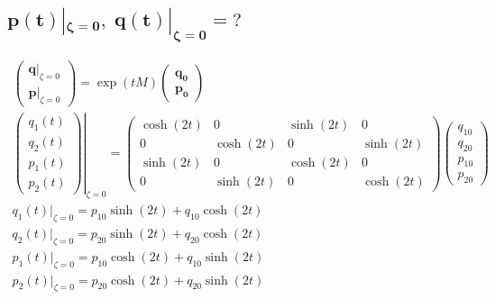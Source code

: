 \documentclass[10pt,a4paper]{article}
\newcommand{\mat}[1]{
    \begin{pmatrix}
        #1
    \end{pmatrix}
}
\begin{document}
\subsection{
    \texorpdfstring{
        $\pmb{ p(t)|_{\zeta=0}, \; q(t)|_{\zeta=0} = \mathit{?} }$
    }{
        p(t)|\{z=0\}, q(t)|\{z=0\} = ?
    }
}
\begin{gather*}
    \mat{
        \bm{q}|_{\zeta=0} \\ \bm{p}|_{\zeta=0}
    }
    =
    \exp(tM)
    \mat{
        \bm{q_0} \\ \bm{p_0}
    }
    \\[15pt]
    \left.
    \mat{
        q_1(t) \\ q_2(t) \\ p_1(t) \\ p_2(t)
    }
    \right|_{\zeta=0}
    =
    \mat{\cosh{\left(2 t \right)} & 0 & \sinh{\left(2 t \right)} & 0\\0 & \cosh{\left(2 t \right)} & 0 & \sinh{\left(2 t \right)}\\\sinh{\left(2 t \right)} & 0 & \cosh{\left(2 t \right)} & 0\\0 & \sinh{\left(2 t \right)} & 0 & \cosh{\left(2 t \right)}}
    \mat{
        q_{10} \\ q_{20} \\ p_{10} \\ p_{20}
    }
    \\[20pt]
    q_1(t)|_{\zeta=0} = p_{10} \sinh{\left(2 t \right)} + q_{10} \cosh{\left(2 t \right)}
    \\[5pt]
    q_2(t)|_{\zeta=0} = p_{20} \sinh{\left(2 t \right)} + q_{20} \cosh{\left(2 t \right)}
    \\[5pt]
    p_1(t)|_{\zeta=0} = p_{10} \cosh{\left(2 t \right)} + q_{10} \sinh{\left(2 t \right)}
    \\[5pt]
    p_2(t)|_{\zeta=0} = p_{20} \cosh{\left(2 t \right)} + q_{20} \sinh{\left(2 t \right)}
\end{gather*}
\end{document}
